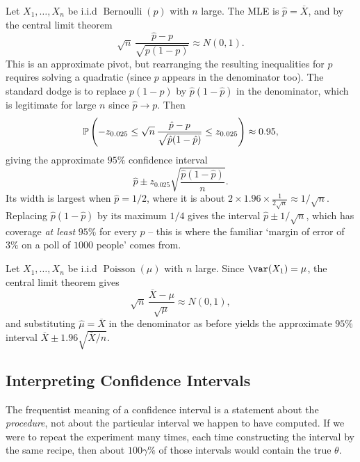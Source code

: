 \documentclass[a4paper]{scrartcl}
\newcommand{\Poisson}{\operatorname{Poisson}}
\newcommand{\Bern}{\operatorname{Bernoulli}}
\begin{document}
\begin{example}
  Let $X_1, \dots, X_n$ be i.i.d $\Bern(p)$ with $n$ large. The MLE is $\hat p = \overline{X}$, and by the central limit theorem
  $$
  \sqrt{n}\,\frac{\hat p - p}{\sqrt{p(1-p)}} \approx N(0,1).
  $$
  This is an approximate pivot, but rearranging the resulting inequalities for $p$ requires solving a quadratic (since $p$ appears in the denominator too). The standard dodge is to replace $p(1-p)$ by $\hat p (1 - \hat p)$ in the denominator, which is legitimate for large $n$ since $\hat p \to p$. Then
  $$
  \mathbb{P}\left(-z_{0.025} \leq \sqrt{n}\,\frac{\hat p - p}{\sqrt{\hat p(1-\hat p)}} \leq z_{0.025}\right) \approx 0.95,
  $$
  giving the approximate $95\%$ confidence interval
  $$
  \hat p \pm z_{0.025}\sqrt{\frac{\hat p (1-\hat p)}{n}}.
  $$
  Its width is largest when $\hat p = 1/2$, where it is about $2 \times 1.96 \times \frac{1}{2\sqrt{n}} \approx 1/\sqrt{n}$. Replacing $\hat p (1-\hat p)$ by its maximum $1/4$ gives the  interval $\hat p \pm 1/\sqrt{n}$, which has coverage \emph{at least} $95\%$ for every $p$ -- this is where the familiar `margin of error of $3\%$ on a poll of $1000$ people' comes from.
\end{example}

\begin{example}
  Let $X_1, \dots, X_n$ be i.i.d $\Poisson(\mu)$ with $n$ large. Since $\var(X_1) = \mu$, the central limit theorem gives
  $$
  \sqrt{n}\,\frac{\overline{X} - \mu}{\sqrt{\mu}} \approx N(0,1),
  $$
  and substituting $\hat\mu = \overline{X}$ in the denominator as before yields the approximate $95\%$ interval $\overline{X} \pm 1.96\sqrt{\overline{X}/n}$.
\end{example}

\subsection{Interpreting Confidence Intervals}

The frequentist meaning of a confidence interval is a statement about the \emph{procedure}, not about the particular interval we happen to have computed. If we were to repeat the experiment many times, each time constructing the interval by the same recipe, then about $100\gamma\%$ of those intervals would contain the true $\theta$.
\end{document}
